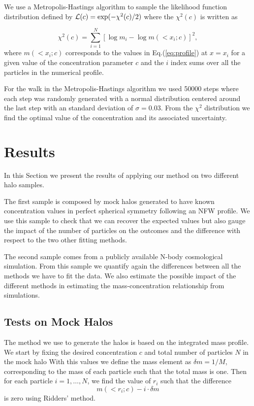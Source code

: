 \documentclass[useAMS,usenatbib]{mn2e}
\begin{document}
We use a Metropolis-Hastings algorithm to sample the likelihood
function distribution defined by ${\cal L}(c)=\exp(-\chi^2(c)/2)$
where the $\chi^2(c)$ is written as

\begin{equation}
\chi^2(c)= \sum_{i=1}^{N}[\log m_i - \log m(< x_i;c)]^2,
\end{equation}
%
where $m(<x_i;c)$ corresponds to the values in Eq.(\ref{eq:profile}) at
$x=x_i$ for a given value of the concentration parameter $c$ and the
$i$ index sums over all the particles in the numerical profile.

For the walk in the Metropolis-Hastings algorithm we used 50000 steps
where each step was randomly generated with a normal distribution
centered around the last step with an standard deviation of
$\sigma=0.03$.
From the $\chi^2$ distribution we find the optimal value of the
concentration and  its associated uncertainty.

\section{Results}
\label{sec:results}

In this Section we present the results of applying our method on two
different halo samples.

The first sample is composed by mock halos generated to have known
concentration values in perfect spherical symmetry following an NFW
profile.
We use this sample to check that we can recover the expected values
but also gauge the impact of the number of particles on the outcomes
and the difference with respect to the two other fitting methods.


The second sample comes from a publicly available N-body cosmological
simulation.
From this sample we quantify again the differences between all the
methods we have to fit the data.
We also estimate the possible impact of the different methods in
estimating the mass-concentration relationship from simulations.

\subsection{Tests on Mock Halos}

The method we use to generate the halos is based on the integrated
mass profile.
We start by fixing the desired concentration $c$ and total number of
particles $N$ in the mock halo
With this values we define the mass element as $\delta m = 1/M$, corresponding
to the mass of each particle such that the total mass is one.
Then for each particle $i=1,\ldots,N$, we find the value of $r_i$ such that
the difference
%
\begin{equation}
m(<r_i;c) - i \cdot \delta m
\end{equation}
%
is zero using Ridders' method.
\end{document}
